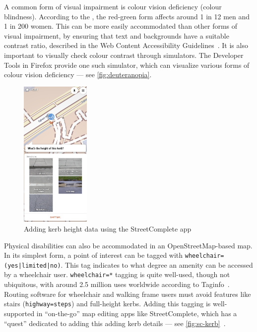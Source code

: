 \documentclass[hyphens]{final_report}
\begin{document}
A common form of visual impairment is colour vision deficiency (colour blindness). According to the \textcite{nhs-colour-vision-deficiency}, the red-green form affects around 1 in 12 men and 1 in 200 women. This can be more easily accommodated than other forms of visual impairment, by ensuring that text and backgrounds have a suitable contrast ratio, described in the Web Content Accessibility Guidelines~\cite{w3c-wcag}. It is also important to visually check colour contrast through simulators. The Developer Tools in Firefox provide one such simulator, which can visualize various forms of colour vision deficiency --- see \autoref{fig:deuteranopia}.

\begin{figure}[ht]
    \centering
    \includegraphics[width=0.3\textwidth]{images/street-complete-kerb.jpg}
    \caption{Adding kerb height data using the StreetComplete app}\label{fig:sc-kerb}
\end{figure}

Physical disabilities can also be accommodated in an OpenStreetMap-based map. In its simplest form, a point of interest can be tagged with \texttt{wheelchair=(yes|limited|no)}. This tag indicates to what degree an amenity can be accessed by a wheelchair user. \texttt{wheelchair=*} tagging is quite well-used, though not ubiquitous, with around 2.5 million uses worldwide according to Taginfo~\cite{taginfo-wheelchair}. Routing software for wheelchair and walking frame users must avoid features like stairs (\texttt{highway=steps}) and full-height kerbs. Adding this tagging is well-supported in ``on-the-go'' map editing apps like StreetComplete, which has a ``quest'' dedicated to adding this adding kerb details --- see \autoref{fig:sc-kerb}~\cite{streetcomplete}. 
\end{document}
